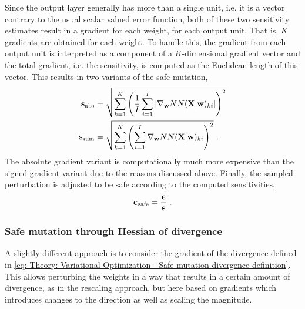 Since the output layer generally has more than a single unit, i.e. it is a vector contrary to the usual scalar valued error function, both of these two sensitivity estimates result in a gradient for each weight, for each output unit. That is, $K$ gradients are obtained for each weight. To handle this, the gradient from each output unit is interpreted as a component of a $K$-dimensional gradient vector and the total gradient, i.e. the sensitivity, is computed as the Euclidean length of this vector. This results in two variants of the safe mutation,
\begin{align}
    {\mathbf{s}}_\text{abs} &= \sqrt{\sum_{k=1}^K {\left(\frac{1}{I}\sum_{i=1}^I{\left\lvert\nabla_{\mathbf{w}} NN({\mathbf{X}}|{\mathbf{w}})_{ki}\right\rvert}\right)}^2}\\
    {\mathbf{s}}_\text{sum} &= \sqrt{\sum_{k=1}^K {\left(\sum_{i=1}^I\nabla_{\mathbf{w}} NN({\mathbf{X}}|{\mathbf{w}})_{ki}\right)}^2} \ .
\end{align}
The absolute gradient variant is computationally much more expensive than the signed gradient variant due to the reasons discussed above. Finally, the sampled perturbation is adjusted to be safe according to the computed sensitivities,
\begin{equation}\label{eq: Theory: Safe mutation scaling}
    {\boldsymbol{\upepsilon}}_\text{safe} = \frac{{\boldsymbol{\upepsilon}}}{{\mathbf{s}}} \ .
\end{equation}


\subsubsection{Safe mutation through Hessian of divergence}
A slightly different approach is to consider the gradient of the divergence defined in \eqref{eq: Theory: Variational Optimization - Safe mutation divergence definition}. This allows perturbing the weights in a way that results in a certain amount of divergence, as in the rescaling approach, but here based on gradients which introduces changes to the direction as well as scaling the magnitude.

